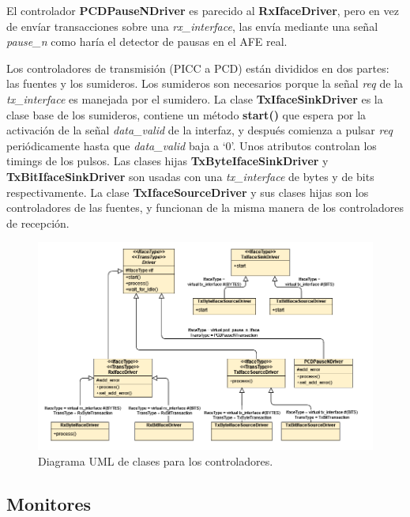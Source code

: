 \documentclass[a4paper, twoside, 11pt]{report}
\begin{document}
El controlador \textbf{PCDPauseNDriver} es parecido al \textbf{RxIfaceDriver}, pero en vez de envíar transacciones sobre una \textit{rx\_interface}, las envía mediante una señal \textit{pause\_n} como haría el detector de pausas en el AFE real.

Los controladores de transmisión (PICC a PCD) están divididos en dos partes: las fuentes y los sumideros. Los sumideros son necesarios porque la señal \textit{req} de la \textit{tx\_interface} es manejada por el sumidero. La clase \textbf{TxIfaceSinkDriver} es la clase base de los sumideros, contiene un método \textbf{start()} que espera por la activación de la señal \textit{data\_valid} de la interfaz, y después comienza a pulsar \textit{req} periódicamente hasta que \textit{data\_valid} baja a ‘0’. Unos atributos controlan los timings de los pulsos. Las clases hijas \textbf{TxByteIfaceSinkDriver} y \textbf{TxBitIfaceSinkDriver} son usadas con una \textit{tx\_interface} de bytes y de bits respectivamente. La clase \textbf{TxIfaceSourceDriver} y sus clases hijas son los controladores de las fuentes, y funcionan de la misma manera de los controladores de recepción.

\begin{figure}[htbp]
  \centering
  \includegraphics[width=1.0\textwidth]{./img/drivers_uml.vpd}
  \caption{Diagrama UML de clases para los controladores.}
  \label{fig:driver_uml}
\end{figure}

\FloatBarrier
\subsection{Monitores}
\end{document}
